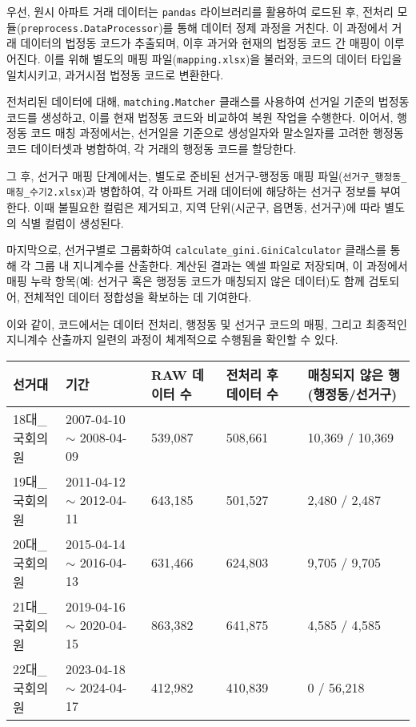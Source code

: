 \documentclass[a4paper,10pt]{article}
\begin{document}
우선, 원시 아파트 거래 데이터는 \texttt{pandas} 라이브러리를 활용하여 로드된 후, 전처리 모듈(\texttt{preprocess.DataProcessor})를 통해 데이터 정제 과정을 거친다. 이 과정에서 거래 데이터의 법정동 코드가 추출되며, 이후 과거와 현재의 법정동 코드 간 매핑이 이루어진다. 이를 위해 별도의 매핑 파일(\texttt{mapping.xlsx})을 불러와, 코드의 데이터 타입을 일치시키고, 과거시점 법정동 코드로 변환한다.

전처리된 데이터에 대해, \texttt{matching.Matcher} 클래스를 사용하여 선거일 기준의 법정동 코드를 생성하고, 이를 현재 법정동 코드와 비교하여 복원 작업을 수행한다. 이어서, 행정동 코드 매칭 과정에서는, 선거일을 기준으로 생성일자와 말소일자를 고려한 행정동 코드 데이터셋과 병합하여, 각 거래의 행정동 코드를 할당한다.

그 후, 선거구 매핑 단계에서는, 별도로 준비된 선거구-행정동 매핑 파일(\texttt{선거구\_행정동\_매칭\_수기2.xlsx})과 병합하여, 각 아파트 거래 데이터에 해당하는 선거구 정보를 부여한다. 이때 불필요한 컬럼은 제거되고, 지역 단위(시군구, 읍면동, 선거구)에 따라 별도의 식별 컬럼이 생성된다.

마지막으로, 선거구별로 그룹화하여 \texttt{calculate\_gini.GiniCalculator} 클래스를 통해 각 그룹 내 지니계수를 산출한다. 계산된 결과는 엑셀 파일로 저장되며, 이 과정에서 매핑 누락 항목(예: 선거구 혹은 행정동 코드가 매칭되지 않은 데이터)도 함께 검토되어, 전체적인 데이터 정합성을 확보하는 데 기여한다.

이와 같이, 코드에서는 데이터 전처리, 행정동 및 선거구 코드의 매핑, 그리고 최종적인 지니계수 산출까지 일련의 과정이 체계적으로 수행됨을 확인할 수 있다.

\begin{center}
\begin{tabularx}{\textwidth}{lXXXX}
    \hline
    선거대 & 기간 & RAW 데이터 수 & 전처리 후 데이터 수 & 매칭되지 않은 행 (행정동/선거구) \\
    \hline
    18대\_국회의원 & 2007-04-10 $\sim$ 2008-04-09 & 539,087 & 508,661 & 10,369 / 10,369 \\
    19대\_국회의원 & 2011-04-12 $\sim$ 2012-04-11 & 643,185 & 501,527 & 2,480 / 2,487 \\
    20대\_국회의원 & 2015-04-14 $\sim$ 2016-04-13 & 631,466 & 624,803 & 9,705 / 9,705 \\
    21대\_국회의원 & 2019-04-16 $\sim$ 2020-04-15 & 863,382 & 641,875 & 4,585 / 4,585 \\
    22대\_국회의원 & 2023-04-18 $\sim$ 2024-04-17 & 412,982 & 410,839 & 0 / 56,218 \\
    \hline
\end{tabularx}
\end{center}
\end{document}
